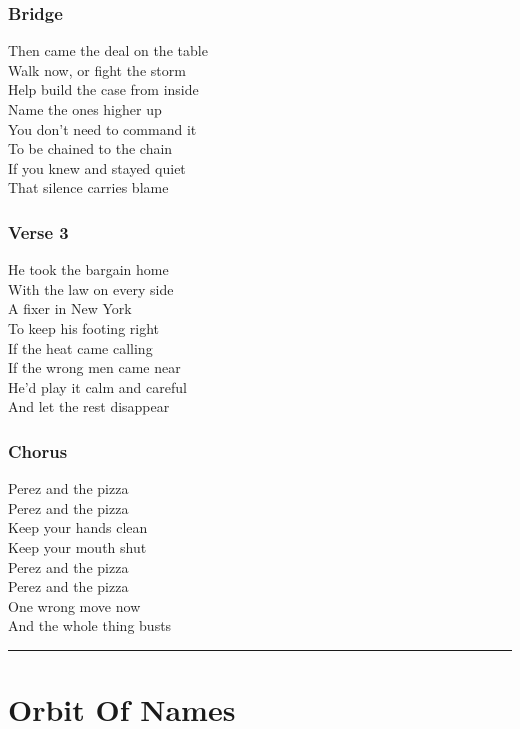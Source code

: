 \subsubsection{Bridge}\label{bridge-9}

Then came the deal on the table\\
Walk now, or fight the storm\\
Help build the case from inside\\
Name the ones higher up\\
You don't need to command it\\
To be chained to the chain\\
If you knew and stayed quiet\\
That silence carries blame

\subsubsection{Verse 3}\label{verse-3-6}

He took the bargain home\\
With the law on every side\\
A fixer in New York\\
To keep his footing right\\
If the heat came calling\\
If the wrong men came near\\
He'd play it calm and careful\\
And let the rest disappear

\subsubsection{Chorus}\label{chorus-31}

Perez and the pizza\\
Perez and the pizza\\
Keep your hands clean\\
Keep your mouth shut\\
Perez and the pizza\\
Perez and the pizza\\
One wrong move now\\
And the whole thing busts

\begin{center}\rule{0.5\linewidth}{0.5pt}\end{center}

\section{Orbit Of Names}\label{orbit-of-names}

